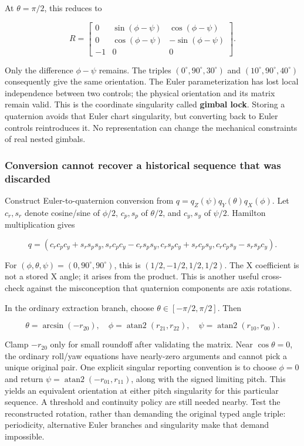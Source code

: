At \(\theta=\pi/2\), this reduces to

\[
R=\begin{bmatrix}
0&\sin(\phi-\psi)&\cos(\phi-\psi)\\
0&\cos(\phi-\psi)&-\sin(\phi-\psi)\\
-1&0&0
\end{bmatrix}.
\]

Only the difference \(\phi-\psi\) remains. The triples \((0^\circ,90^\circ,30^\circ)\) and \((10^\circ,90^\circ,40^\circ)\) consequently give the same orientation. The Euler parameterization has lost local independence between two controls; the physical orientation and its matrix remain valid. This is the coordinate singularity called \textbf{gimbal lock}. Storing a quaternion avoids that Euler chart singularity, but converting back to Euler controls reintroduces it. No representation can change the mechanical constraints of real nested gimbals.

\subsubsection{Conversion cannot recover a historical sequence that was discarded}\label{conversion-cannot-recover-a-historical-sequence-that-was-discarded}

Construct Euler-to-quaternion conversion from \(q=q_Z(\psi)q_Y(\theta)q_X(\phi)\). Let \(c_r,s_r\) denote cosine/sine of \(\phi/2\), \(c_p,s_p\) of \(\theta/2\), and \(c_y,s_y\) of \(\psi/2\). Hamilton multiplication gives

\[
q=(c_rc_pc_y+s_rs_ps_y,
s_rc_pc_y-c_rs_ps_y,
c_rs_pc_y+s_rc_ps_y,
c_rc_ps_y-s_rs_pc_y).
\]

For \((\phi,\theta,\psi)=(0,90^\circ,90^\circ)\), this is \((1/2,-1/2,1/2,1/2)\). The X coefficient is not a stored X angle; it arises from the product. This is another useful cross-check against the misconception that quaternion components are axis rotations.

In the ordinary extraction branch, choose \(\theta\in[-\pi/2,\pi/2]\). Then

\[
\theta=\arcsin(-r_{20}),\quad
\phi=\operatorname{atan2}(r_{21},r_{22}),\quad
\psi=\operatorname{atan2}(r_{10},r_{00}).
\]

Clamp \(-r_{20}\) only for small roundoff after validating the matrix. Near \(\cos\theta=0\), the ordinary roll/yaw equations have nearly-zero arguments and cannot pick a unique original pair. One explicit singular reporting convention is to choose \(\phi=0\) and return \(\psi=\operatorname{atan2}(-r_{01},r_{11})\), along with the signed limiting pitch. This yields an equivalent orientation at either pitch singularity for this particular sequence. A threshold and continuity policy are still needed nearby. Test the reconstructed rotation, rather than demanding the original typed angle triple: periodicity, alternative Euler branches and singularity make that demand impossible.

